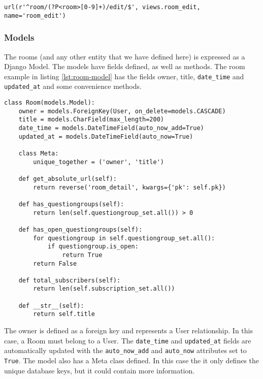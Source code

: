 \begin{lstlisting}[caption=URL Pattern for Room Edit, label=lst:urlpattern-for-room-edit]
url(r'^room/(?P<room>[0-9]+)/edit/$', views.room_edit, name='room_edit')
\end{lstlisting}

\subsubsection*{Models}
The rooms (and any other entity that we have defined here) is expressed as a Django Model.  
The models have fields defined, as well as methods. The room example in listing \ref{lst:room-model} has the fields owner, title, \texttt{date\_time} and \texttt{updated\_at} and some convenience methods.

\begin{lstlisting}[caption=The Room Model, label=lst:room-model]
class Room(models.Model):
    owner = models.ForeignKey(User, on_delete=models.CASCADE)
    title = models.CharField(max_length=200)
    date_time = models.DateTimeField(auto_now_add=True)
    updated_at = models.DateTimeField(auto_now=True)

    class Meta:
        unique_together = ('owner', 'title')

    def get_absolute_url(self):
        return reverse('room_detail', kwargs={'pk': self.pk})

    def has_questiongroups(self):
        return len(self.questiongroup_set.all()) > 0

    def has_open_questiongroups(self):
        for questiongroup in self.questiongroup_set.all():
            if questiongroup.is_open:
                return True
        return False

    def total_subscribers(self):
        return len(self.subscription_set.all())

    def __str__(self):
        return self.title
\end{lstlisting}

The owner is defined as a foreign key and represents a User relationship. In this case, a Room must belong to a User. The \texttt{date\_time} and \texttt{updated\_at} fields are automatically updated with the \texttt{auto\_now\_add} and \texttt{auto\_now} attributes set to \texttt{True}. The model also has a Meta class defined. In this case the it only defines the unique database keys, but it could contain more information.

